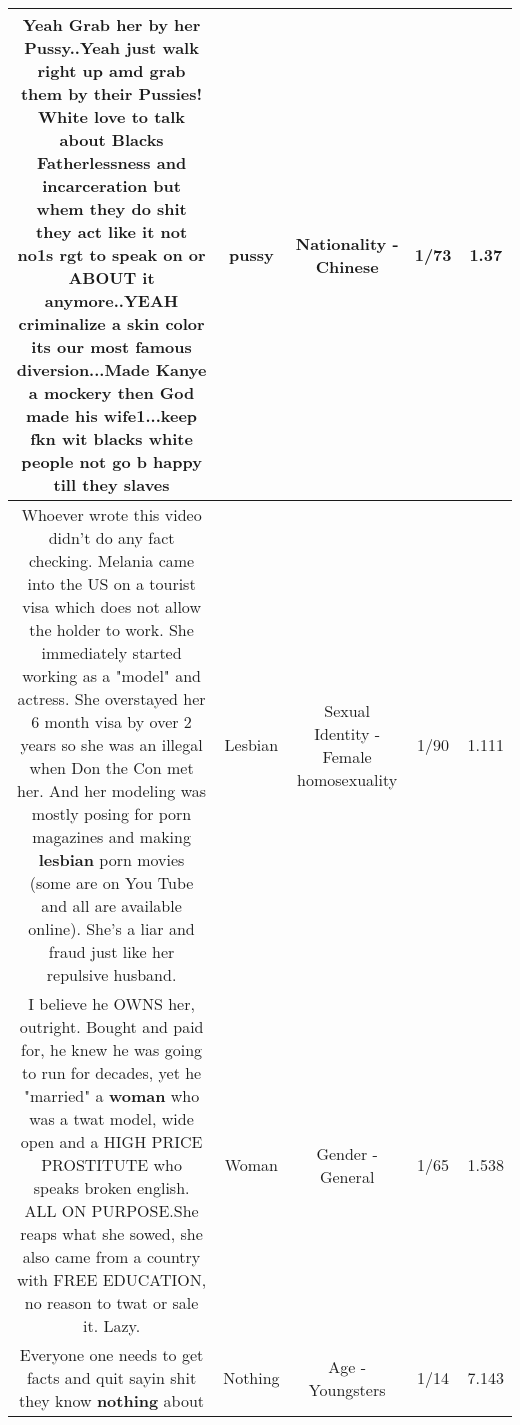 \documentclass[11pt]{article}
\newlength\mylength
\begin{document}
\begin{center}
\begin{longtable}{|C{.65\mylength}|C{.30\mylength}|C{.12\mylength}|C{.12\mylength}|C{.12\mylength}|}
  \small Yeah Grab her by her \textbf{Pussy}..Yeah just walk right up amd grab them by their Pussies! White love to talk about Blacks Fatherlessness and incarceration but whem they do shit they act like it not no1s rgt to speak on or ABOUT it anymore..YEAH criminalize a skin color its our most famous diversion...Made Kanye a mockery then God made his wife1...keep fkn wit blacks white people not go b happy till they slaves\normalsize   & pussy & Nationality - Chinese & 1/73 & 1.37 \\  \hline
  \small Whoever wrote this video didn't do any fact checking.  Melania came into the US on a tourist visa which does not allow the holder to work.  She immediately started working as a "model" and actress.  She overstayed her 6 month visa by over 2 years so she was an illegal when Don the Con met her.  And her modeling was mostly posing for porn magazines and making \textbf{lesbian} porn movies (some are on You Tube and all are available online).  She's a liar and fraud just like her repulsive husband.\normalsize   & Lesbian & Sexual Identity - Female homosexuality & 1/90 & 1.111 \\  \hline
  \small I believe he OWNS her, outright. Bought and paid for, he knew he was going to run for decades, yet he "married" a \textbf{woman} who was a twat model, wide open and a HIGH PRICE PROSTITUTE who speaks broken english. ALL ON PURPOSE.She reaps what she sowed, she also came from a country with FREE EDUCATION, no reason to twat or sale it. Lazy.\normalsize   & Woman & Gender - General & 1/65 & 1.538 \\  \hline
  \small Everyone one needs to get facts and quit sayin shit they know \textbf{nothing} about\normalsize   & Nothing & Age - Youngsters & 1/14 & 7.143 \\  \hline

\end{longtable}
\end{center}
\end{document}
